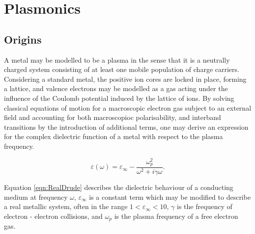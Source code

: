 \section{Plasmonics}
\label{sec:plasmons}
\subsection{Origins}
\label{sec:origins_plasmon}
A metal may be modelled to be a plasma in the sense that it is a neutrally charged system consisting of at least one mobile population of charge carriers. Considering a standard metal, the positive ion cores are locked in place, forming a lattice, and valence electrons may be modelled as a gas acting under the influence of the Coulomb potential induced by the lattice of ions. By solving classical equations of motion for a macroscopic electron gas subject to an external field and accounting for both macroscopioc polarisability, and interband transitions by the introduction of additional terms, one may derive an expression for the complex dielectric function of a metal with respect to the plasma frequency. 

\begin{equation}
    \varepsilon(\omega) = \varepsilon_{\infty} - \frac{\omega_{p}^{2}}{ \omega^{2} + i\gamma\omega }.
    \label{eqn:RealDrude}
\end{equation}

Equation \ref{eqn:RealDrude} describes the dielectric behaviour of a conducting medium at frequency $\omega$, $\varepsilon_{\infty}$ is a constant term which may be modified to describe a real metallic system, often in the range $ 1 < \varepsilon_{\infty} < 10$, $\gamma$ is the frequency of electron - electron collisions, and $\omega_{p}$ is the plasma frequency of a free electron gas.

